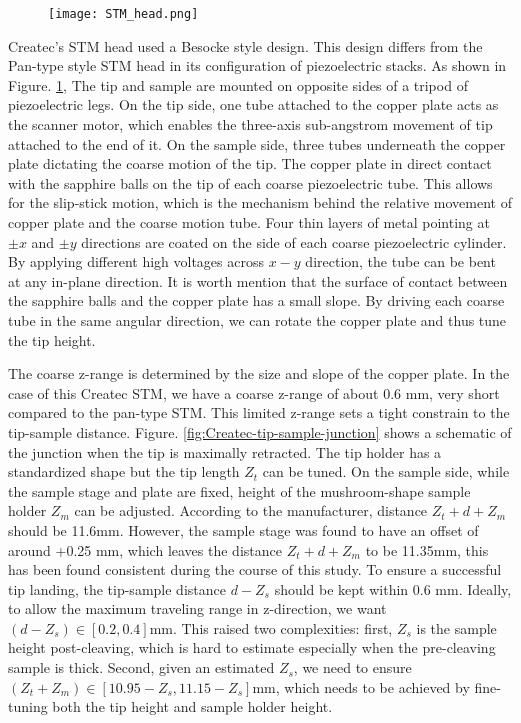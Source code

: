 \begin{figure}
	\centering
	\texttt{[image: STM\_head.png]}
	\caption{}
	\label{fig:STM_head}
\end{figure}

Createc's STM head used a Besocke style design\cite{besockeEasilyOperableScanning1987b}. This design differs from the Pan-type style STM head in its configuration of piezoelectric stacks. As shown in Figure. \ref{fig:STM_head}, The tip and sample are mounted on opposite sides of a tripod of piezoelectric legs. On the tip side, one tube attached to the copper plate acts as the scanner motor, which enables the three-axis sub-angstrom movement of tip attached to the end of it. On the sample side, three tubes underneath the copper plate dictating the coarse motion of the tip. The copper plate in direct contact with the sapphire balls on the tip of each coarse piezoelectric tube. This allows for the slip-stick motion, which is the mechanism behind the relative movement of copper plate and the coarse motion tube. Four thin layers of metal pointing at $\pm x$ and $\pm y$ directions are coated on the side of each coarse piezoelectric cylinder. By applying different high voltages across $x-y$ direction, the tube can be bent at any in-plane direction. It is worth mention that the surface of contact between the sapphire balls and the copper plate has a small slope. By driving each coarse tube in the same angular direction, we can rotate the copper plate and thus tune the tip height.

The coarse z-range is determined by the size and slope of the copper plate. In the case of this Createc \ac{STM}, we have a coarse z-range of about 0.6 mm, very short compared to the pan-type STM. This limited z-range sets a tight constrain to the tip-sample distance. Figure. \ref{fig:Createc-tip-sample-junction} shows a schematic of the junction when the tip is maximally retracted. The tip holder has a standardized shape but the tip length $Z_t$ can be tuned. On the sample side, while the sample stage and plate are fixed, height of the mushroom-shape sample holder $Z_m$ can be adjusted. According to the manufacturer, distance $Z_t + d +Z_m$ should be 11.6mm. However, the sample stage was found to have an offset of around +0.25 mm, which leaves the distance $Z_t + d +Z_m$ to be 11.35mm, this has been found consistent during the course of this study. To ensure a successful tip landing, the tip-sample distance $d-Z_s$ should be kept within 0.6 mm. Ideally, to allow the maximum traveling range in z-direction, we want $(d-Z_s) \in [0.2,0.4]$mm. This raised two complexities: first, $Z_s$ is the sample height post-cleaving, which is hard to estimate especially when the pre-cleaving sample is thick. Second, given an estimated $Z_s$, we need to ensure $(Z_t+Z_m)\in[10.95-Z_s, 11.15-Z_s]$mm, which needs to be achieved by fine-tuning both the tip height and sample holder height.  

